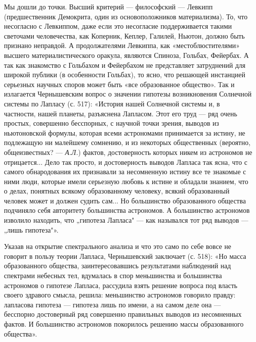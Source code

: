 Мы  дошли  до  точки.  Высший критерий  ---  философский  ---  Левкипп
(предшественник Демокрита, один из основоположников материализма). То,
что несогласно  с Левкиппом,  даже если это  несогласие поддерживается
такими светочами человечества, как  Коперник, Кеплер, Галилей, Ньютон,
должно  быть  признано  неправдой.   А  продолжателями  Левкиппа,  как
«местоблюстителями»  высшего   материалистического  оракула,  являются
Спиноза,  Гольбах,  Фейербах.  А  так как  знакомство  с  Гольбахом  и
Фейербахом  не   представляет  затруднений  для  широкой   публики  (в
особенности  Гольбах),  то  ясно, что  решающей  инстанцией  серьезных
научных  споров   может  быть  «все  образованное   общество».  Так  и
излагается  Чернышевским  вопрос  о  значении  гипотезы  возникновения
Солнечной  системы  по  Лапласу  (с. 517):  «История  нашей  Солнечной
системы и, в  частности, нашей планеты, разъяснена  Лапласом. Этот его
труд ---  ряд очень  простых, совершенно  бесспорных, с  научной точки
зрения,  выводов из  ньютоновской формулы,  которая всеми  астрономами
принимается  за истину,  не  подлежащую ни  малейшему  сомнению, и  из
некоторых  общественных  (вероятно,  общеизвестных?  ---  \emph{А.Л.})
фактов,  достоверность которых  никем из  астрономов не  отрицается...
Дело  так просто,  и достоверность  выводов  Лапласа так  ясна, что  с
самого  обнародования  их  признавали  за несомненную  истину  все  те
знакомые  с  ними  люди,  которые  имели  серьезную  любовь  к  истине
и  обладали  знанием,  что  о делах,  понятных  всякому  образованному
человеку,  всякий образованный  человек может  и должен  судить сам...
Но  большинство  образованного   общества  подчиняло  себя  авторитету
большинства  астрономов. А  большинство астрономов  изволило находить,
что „гипотеза  Лапласа" ---  как назывался тот  ряд выводов  --- „лишь
гипотеза"».

Указав на открытие спектрального анализа и  что это само по себе вовсе
не  говорит  в  пользу  теории  Лапласа,  Чернышевский  заключает  (с.
518): «Но масса образованного общества, заинтересовавшись результатами
наблюдений над спектрами небесных тел,  вдумалась в спор меньшинства и
большинства  астрономов о  гипотезе Лапласа,  рассудила взять  решение
вопроса  под  власть  своего   здравого  смысла,  решила:  меньшинство
астрономов говорило  правду: лапласова  гипотеза --- гипотеза  лишь по
имени, а  на самом деле  она --- бесспорно достоверный  ряд совершенно
правильных  выводов из  несомненных фактов.  И большинство  астрономов
покорилось решению массы образованного общества».

